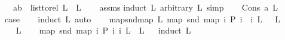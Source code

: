 \begin{isabellebody}
\ \ \ {\isachardoublequoteopen}{\isacharparenleft}{\kern0pt}a{\isacharcomma}{\kern0pt}b{\isacharparenright}{\kern0pt}\ {\isasymin}\ list{\isacharunderscore}{\kern0pt}to{\isacharunderscore}{\kern0pt}rel\ {\isacharparenleft}{\kern0pt}L\ {\isacharat}{\kern0pt}\ L{}{\isacharparenright}{\kern0pt}{\isachardoublequoteclose}\isanewline
%
\isadelimproof
\ \ %
\endisadelimproof
%
\isatagproof
{}\isamarkupfalse%
\ assms\isanewline
{}\isamarkupfalse%
{\isacharparenleft}{\kern0pt}induct\ L{}\ arbitrary{\isacharcolon}{\kern0pt}\ L{\isacharcomma}{\kern0pt}\ simp{\isacharparenright}{\kern0pt}\isanewline
\ \ \isamarkupfalse%
\ {\isacharparenleft}{\kern0pt}Cons\ a\ L{}{\isacharparenright}{\kern0pt}\isanewline
\ \ \isamarkupfalse%
\ \isamarkupfalse%
\ {\isacharquery}{\kern0pt}case\ \isanewline
\ \ \isamarkupfalse%
{\isacharparenleft}{\kern0pt}induct\ L{\isacharcomma}{\kern0pt}\ auto{\isacharparenright}{\kern0pt}\isanewline
\ \ \isamarkupfalse%
\isanewline
{}\isamarkupfalse%
%
\endisatagproof
{\isafoldproof}%
%
\isadelimproof
\isanewline
%
\endisadelimproof
\isanewline
\isanewline
{}\isamarkupfalse%
\ map{\isacharunderscore}{\kern0pt}snd{\isacharunderscore}{\kern0pt}map{\isacharcolon}{\kern0pt}\ {\isachardoublequoteopen}{\isasymAnd}L{\isachardot}{\kern0pt}\ {\isacharparenleft}{\kern0pt}map\ snd\ {\isacharparenleft}{\kern0pt}map\ {\isacharparenleft}{\kern0pt}{\isasymlambda}i{\isachardot}{\kern0pt}\ {\isacharparenleft}{\kern0pt}P\ i\ {\isacharcomma}{\kern0pt}\ i{\isacharparenright}{\kern0pt}{\isacharparenright}{\kern0pt}\ L{\isacharparenright}{\kern0pt}{\isacharparenright}{\kern0pt}\ {\isacharequal}{\kern0pt}\ \ L{\isachardoublequoteclose}\ \isanewline
%
\isadelimproof
%
\endisadelimproof
%
\isatagproof
{}\isamarkupfalse%
\ {\isacharminus}{\kern0pt}\isanewline
\ \ \isamarkupfalse%
\ L\isanewline
\ \ \isamarkupfalse%
\ {\isachardoublequoteopen}map\ snd\ {\isacharparenleft}{\kern0pt}map\ {\isacharparenleft}{\kern0pt}{\isasymlambda}i{\isachardot}{\kern0pt}\ {\isacharparenleft}{\kern0pt}P\ i{\isacharcomma}{\kern0pt}\ i{\isacharparenright}{\kern0pt}{\isacharparenright}{\kern0pt}\ L{\isacharparenright}{\kern0pt}\ {\isacharequal}{\kern0pt}\ L{\isachardoublequoteclose}\isanewline
\ \ \isamarkupfalse%
{\isacharparenleft}{\kern0pt}induct\ L{\isacharparenright}{\kern0pt}\isanewline
\ \ \ \ \isamarkupfalse%

\end{isabellebody}
